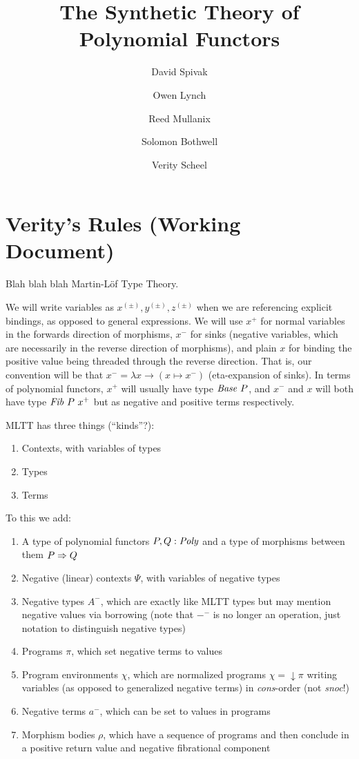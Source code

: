 \documentclass[final]{amsart}
\title{The Synthetic Theory of Polynomial Functors}
\author{David Spivak}
\author{Owen Lynch}
\author{Reed Mullanix}
\author{Solomon Bothwell}
\author{Verity Scheel}
\begin{document}
\maketitle

\section{Verity's Rules (Working Document)}

Blah blah blah Martin-L\"of Type Theory.

We will write variables as $x^{(\pm)}, y^{(\pm)}, z^{(\pm)}$ when we are referencing explicit bindings, as opposed to general expressions.
We will use $x^{+}$ for normal variables in the forwards direction of morphisms, $x^{-}$ for sinks (negative variables, which are necessarily in the reverse direction of morphisms), and plain $x$ for binding the positive value being threaded through the reverse direction.
That is, our convention will be that $x^{-} = \lambda x \to (x \mapsto x^{-})$ (eta-expansion of sinks).
In terms of polynomial functors, $x^{+}$ will usually have type $\mathit{Base}\ P$, and $x^{-}$ and $x$ will both have type $\mathit{Fib}\ P\ x^{+}$ but as negative and positive terms respectively.

MLTT has three things (``kinds''?):
\begin{enumerate}
  \item Contexts, with variables of types
  \item Types
  \item Terms
\end{enumerate}

To this we add:
\begin{enumerate}
  \item A type of polynomial functors $P, Q : \mathit{Poly}$ and a type of morphisms between them $P \Rightarrow Q$
  \item Negative (linear) contexts $\Psi$, with variables of negative types
  \item Negative types $A^{-}$, which are exactly like MLTT types but may mention negative values via borrowing (note that ${-}^{-}$ is no longer an operation, just notation to distinguish negative types)
  \item Programs $\pi$, which set negative terms to values
  \item Program environments $\chi$, which are normalized programs $\chi = {\downarrow \pi}$ writing variables (as opposed to generalized negative terms) in \emph{cons}-order (not \emph{snoc}!)
  \item Negative terms $a^{-}$, which can be set to values in programs
  \item Morphism bodies $\rho$, which have a sequence of programs and then conclude in a positive return value and negative fibrational component
\end{enumerate}
\end{document}
